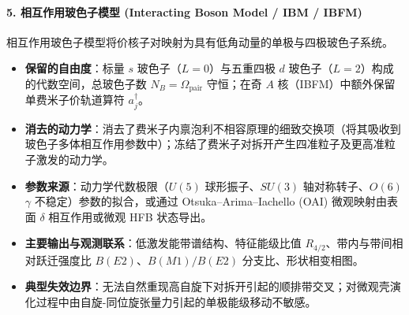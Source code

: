\paragraph{5. 相互作用玻色子模型 (Interacting Boson Model / IBM / IBFM)}
相互作用玻色子模型将价核子对映射为具有低角动量的单极与四极玻色子系统。\cite{book-casten-nuclear-structure-simple-perspective,book-heyde-nuclear-physics-concepts,nomura-2022-questioning-wobbling-ibfm}
\begin{itemize}
\item \textbf{保留的自由度}：标量 $s$ 玻色子（$L=0$）与五重四极 $d$ 玻色子（$L=2$）构成的代数空间，总玻色子数 $N_B = \Omega_{\mathrm{pair}}$ 守恒；在奇 $A$ 核（IBFM）中额外保留单费米子价轨道算符 $a^\dagger_j$。
\item \textbf{消去的动力学}：消去了费米子内禀泡利不相容原理的细致交换项（将其吸收到玻色子多体相互作用参数中）；冻结了费米子对拆开产生四准粒子及更高准粒子激发的动力学。
\item \textbf{参数来源}：动力学代数极限（$U(5)$ 球形振子、$SU(3)$ 轴对称转子、$O(6)$ $\gamma$ 不稳定）参数的拟合，或通过 Otsuka--Arima--Iachello (OAI) 微观映射由表面 $\delta$ 相互作用或微观 HFB 状态导出。\cite{nomura-2022-questioning-wobbling-ibfm}
\item \textbf{主要输出与观测联系}：低激发能带谱结构、特征能级比值 $R_{4/2}$、带内与带间相对跃迁强度比 $B(E2)$、$B(M1)/B(E2)$ 分支比、形状相变相图。
\item \textbf{典型失效边界}：无法自然重现高自旋下对拆开引起的顺排带交叉；对微观壳演化过程中由自旋-同位旋张量力引起的单极能级移动不敏感。
\end{itemize}

